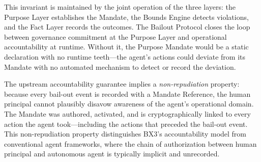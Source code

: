 This invariant is maintained by the joint operation of the three layers: the Purpose Layer establishes the Mandate, the Bounds Engine detects violations, and the Fact Layer records the outcomes. The Bailout Protocol closes the loop between governance commitment at the Purpose Layer and operational accountability at runtime. Without it, the Purpose Mandate would be a static declaration with no runtime teeth—the agent's actions could deviate from its Mandate with no automated mechanism to detect or record the deviation.

The upstream accountability guarantee implies a \emph{non-repudiation} property: because every bail-out event is recorded with a Mandate Reference, the human principal cannot plausibly disavow awareness of the agent's operational domain. The Mandate was authored, activated, and is cryptographically linked to every action the agent took—including the actions that preceded the bail-out event. This non-repudiation property distinguishes BX3's accountability model from conventional agent frameworks, where the chain of authorization between human principal and autonomous agent is typically implicit and unrecorded.

